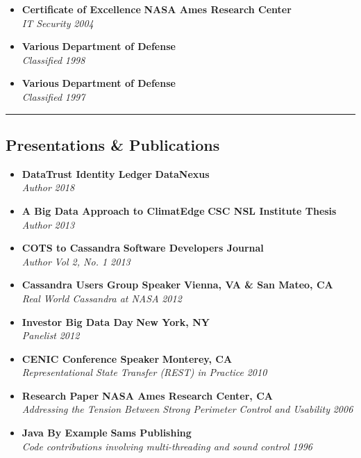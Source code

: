 \begin{itemize}
	\item
	\headerrow
		{\textbf{Certificate of Excellence}}
		{\textbf{NASA Ames Research Center}}
	\\
	\headerrow
		{\emph{IT Security}}
		{\emph{2004}}

	\item
	\headerrow
		{\textbf{Various}}
		{\textbf{Department of Defense}}
	\\
	\headerrow
		{\emph{Classified}}
		{\emph{1998}}
	\item
	\headerrow
		{\textbf{Various}}
		{\textbf{Department of Defense}}
	\\
	\headerrow
		{\emph{Classified}}
		{\emph{1997}}
\end{itemize}

\hrule
\vspace{-0.4em}

\subsection*{Presentations \& Publications}

\begin{itemize}
    \parskip=0.1em
    \item
    \headerrow
        {\textbf{DataTrust Identity Ledger}}
        {\textbf{DataNexus}}
    \\
    \headerrow
        {\emph{Author}}
        {\emph{2018}}
    \item
    \headerrow
        {\textbf{A Big Data Approach to ClimatEdge\texttrademark}}
        {\textbf{CSC NSL Institute Thesis}}
    \\
    \headerrow
        {\emph{Author}}
        {\emph{2013}}
    \item
	\headerrow
		{\textbf{COTS to Cassandra}}
		{\textbf{Software Developers Journal}}
	\\
	\headerrow
		{\emph{Author}}
		{\emph{Vol 2, No. 1 2013}}
    \item
	\headerrow
		{\textbf{Cassandra Users Group Speaker}}
		{\textbf{Vienna, VA \& San Mateo, CA}}
	\\
	\headerrow
		{\emph{Real World Cassandra at NASA}}
		{\emph{2012}}
	\item
	\headerrow
		{\textbf{Investor Big Data Day}}
		{\textbf{New York, NY}}
	\\
	\headerrow
		{\emph{Panelist}}
		{\emph{2012}}
	\item
    \headerrow
		{\textbf{CENIC Conference Speaker}}
		{\textbf{Monterey, CA}}
	\\
	\headerrow
		{\emph{Representational State Transfer (REST) in Practice}}
		{\emph{2010}}
	\item
	\headerrow
		{\textbf{Research Paper}}
		{\textbf{NASA Ames Research Center, CA}}
	\\
	\headerrow
		{\emph{Addressing the Tension Between Strong Perimeter Control and Usability}}
		{\emph{2006}}
	\item
	\headerrow
		{\textbf{Java By Example}}
		{\textbf{Sams Publishing}}
	\\
	\headerrow
		{\emph{Code contributions involving multi-threading and sound control}}
		{\emph{1996}}
\end{itemize}

